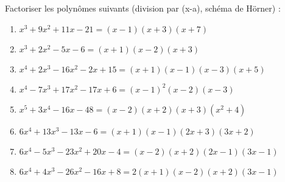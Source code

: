 \begin{solution}
Factoriser les polynômes suivants (division par (x-a), schéma de Hörner) :
\begin{enumerate}
\item ${{x}^{3}}+9{{x}^{2}}+11x-21=(x-1)(x+3)(x+7)$
\item ${{x}^{3}}+2{{x}^{2}}-5x-6=(x+1)(x-2)(x+3)$
\item ${{x}^{4}}+2{{x}^{3}}-16{{x}^{2}}-2x+15=(x+1)(x-1)(x-3)(x+5)$
\item ${{x}^{4}}-7{{x}^{3}}+17{{x}^{2}}-17x+6={{(x-1)}^{2}}(x-2)(x-3)$
\item ${{x}^{5}}+3{{x}^{4}}-16x-48=(x-2)(x+2)(x+3)({{x}^{2}}+4)$
\item $6{{x}^{4}}+13{{x}^{3}}-13x-6=(x+1)(x-1)(2x+3)(3x+2)$
\item $6{{x}^{4}}-5{{x}^{3}}-23{{x}^{2}}+20x-4=(x-2)(x+2)(2x-1)(3x-1)$
\item $6{{x}^{4}}+4{{x}^{3}}-26{{x}^{2}}-16x+8=2(x+1)(x-2)(x+2)(3x-1)$
\end{enumerate}
\end{solution}